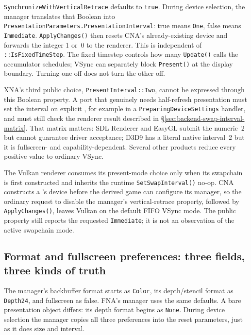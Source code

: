 \texttt{SynchronizeWithVerticalRetrace} defaults to \texttt{true}. During device selection,
the manager translates that Boolean into
\texttt{PresentationParameters.PresentationInterval}: true means \texttt{One}, false means
\texttt{Immediate}. \texttt{ApplyChanges()} then resets CNA's already-existing device and
forwards the integer 1 or~0 to the renderer. This is independent of
\texttt{::IsFixedTimeStep}. The fixed timestep controls how many
\texttt{Update()} calls the accumulator schedules; VSync can separately block
\texttt{Present()} at the display boundary. Turning one off does not turn the other off.

XNA's third public choice, \texttt{PresentInterval::Two}, cannot be expressed through this
Boolean property. A port that genuinely needs half-refresh presentation must set the
interval on explicit , for example in a
\texttt{PreparingDeviceSettings} handler, and must still check the renderer result described
in \S\ref{sec:backend-swap-interval-matrix}. That matrix matters: SDL Renderer and EasyGL
submit the numeric~2 but cannot guarantee driver acceptance; D3D9 has a literal native
interval~2 but it is fullscreen- and capability-dependent. Several other products reduce
every positive value to ordinary VSync.

\begin{sourcenote}
The Vulkan renderer consumes its present-mode choice only when its swapchain is first
constructed and inherits the runtime \texttt{SetSwapInterval()} no-op. CNA constructs a
's device before the derived game can configure its manager, so the ordinary
request to disable the manager's vertical-retrace property, followed by
\texttt{ApplyChanges()}, leaves Vulkan on the default FIFO VSync mode. The public property
still reports the requested \texttt{Immediate}; it is not an observation of the active
swapchain mode.
\end{sourcenote}

\subsection{Format and fullscreen preferences: three fields, three kinds of truth}

The manager's backbuffer format starts as \texttt{Color}, its depth/stencil format as
\texttt{Depth24}, and fullscreen as false. FNA's manager uses the same defaults. A bare
presentation object differs: its depth format begins as \texttt{None}. During device
selection the manager copies all three preferences into the reset parameters, just as it
does size and interval.


